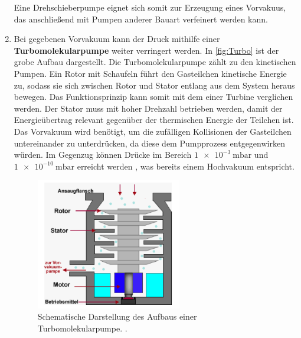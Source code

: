 \begin{enumerate}
    Eine Drehschieberpumpe eignet sich somit zur Erzeugung eines Vorvakuus, das anschließend mit Pumpen anderer Bauart verfeinert werden kann.
    \item Bei gegebenen Vorvakuum kann der Druck mithilfe einer \textbf{Turbomolekularpumpe} weiter verringert werden.
    In \autoref{fig:Turbo} ist der grobe Aufbau dargestellt.
    Die Turbomolekularpumpe zählt zu den kinetischen Pumpen. Ein Rotor mit Schaufeln führt den Gasteilchen kinetische Energie zu, sodass sie
    sich zwischen Rotor und Stator entlang aus dem System heraus bewegen. Das Funktionsprinzip kann somit mit dem einer Turbine verglichen werden. Der
    Stator muss mit hoher Drehzahl betrieben werden, damit der Energieübertrag relevant gegenüber der thermischen Energie der Teilchen ist.
    Das Vorvakuum wird benötigt, um die zufälligen Kollisionen der Gasteilchen untereinander zu unterdrücken, da diese dem Pumpprozess entgegenwirken
    würden. Im Gegenzug können Drücke im Bereich $\qty{1e-3}{\milli\bar}$ und $\qty{1e-10}{\milli\bar}$ erreicht werden \cite{Pfeiffer_Turbomolekularpumpen},
    was bereits einem Hochvakuum entspricht.
    \begin{figure}[H]
        \centering
        \includegraphics[width=0.6\textwidth]{content/pics/turbo.png}
        \caption{Schematische Darstellung des Aufbaus einer Turbomolekularpumpe. \cite{Turbopumpe}.}
        \label{fig:Turbo}
    \end{figure}
\end{enumerate}

